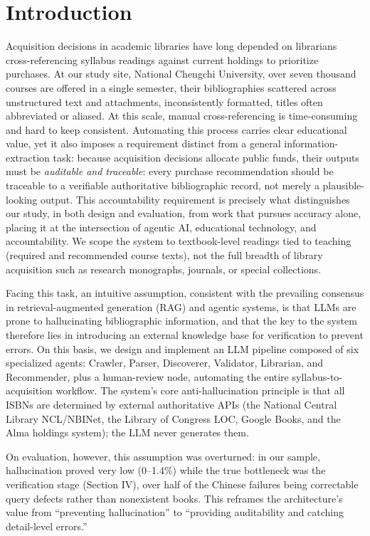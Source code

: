 \documentclass[conference]{IEEEtran}
\begin{document}
\section{Introduction}

Acquisition decisions in academic libraries have long depended on librarians
cross-referencing syllabus readings against current holdings to prioritize
purchases. At our study site, National Chengchi University, over seven thousand
courses are offered in a single semester, their bibliographies scattered across
unstructured text and attachments, inconsistently formatted, titles often
abbreviated or aliased. At this scale, manual cross-referencing is
time-consuming and hard to keep consistent. Automating this process carries
clear educational value, yet it also imposes a requirement distinct from a
general information-extraction task: because acquisition decisions allocate
public
funds, their outputs must be \textit{auditable and traceable}: every purchase
recommendation should be traceable to a verifiable authoritative bibliographic
record, not merely a plausible-looking output. This accountability requirement
is precisely what distinguishes our study, in both design and evaluation, from
work that pursues accuracy alone, placing it at the intersection of agentic AI,
educational technology, and accountability. We scope the system to
textbook-level readings tied to teaching (required and recommended course
texts), not the full breadth of library acquisition such as research monographs,
journals, or special collections.

Facing this task, an intuitive assumption, consistent with the prevailing
consensus in retrieval-augmented generation (RAG) and agentic systems, is that
LLMs are prone to hallucinating bibliographic information, and that the key to
the system therefore lies in introducing an external knowledge base for
verification to prevent errors. On this basis, we design and implement an LLM
pipeline composed of six specialized agents: Crawler, Parser, Discoverer,
Validator, Librarian, and Recommender, plus a human-review node, automating
the entire syllabus-to-acquisition workflow. The system's core
anti-hallucination principle is that all
ISBNs are determined by external authoritative APIs (the National Central
Library NCL/NBINet, the Library of Congress LOC, Google Books, and the Alma
holdings system); the LLM never generates them.

On evaluation, however, this assumption was overturned: in our sample,
hallucination proved very low (0--1.4\%) while the true bottleneck was the
verification stage (Section IV), over half of the Chinese failures being
correctable query defects rather than nonexistent books. This reframes the architecture's value from
``preventing hallucination'' to ``providing auditability and catching
detail-level errors.''
\end{document}

